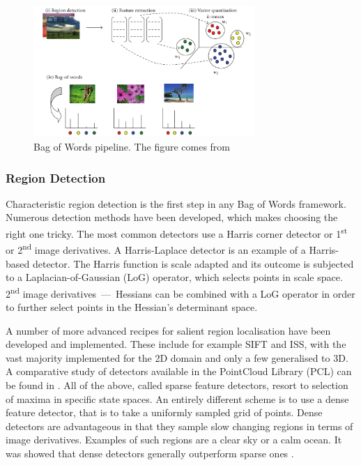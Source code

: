 \documentclass[12pt]{article}
\begin{document}
    \begin{figure}[!ht]
    \centering
    \includegraphics[width=0.75\textwidth]{../figs/tsai2012}
    \caption{Bag of Words pipeline. The figure comes from \cite{tsai2012bag}}
    \label{fig:bow_pipeline}
    \end{figure}
	
  \subsubsection{Region Detection}
    Characteristic region detection is the first step in any Bag of Words 
framework. Numerous detection methods have been developed, which makes choosing 
the right one tricky. The most common detectors use a Harris corner detector or 
1\textsuperscript{st} or 2\textsuperscript{nd} image derivatives. A 
Harris-Laplace detector is an example of a Harris-based detector. The Harris 
function is scale adapted and its outcome is subjected to a 
Laplacian-of-Gaussian (LoG) operator, which selects points in scale space. 
2\textsuperscript{nd} image derivatives~---~Hessians can be combined with a LoG 
operator in order to further select points in the Hessian's determinant space.

    A number of more advanced recipes for salient region localisation have been 
developed and implemented. These include for example SIFT
and ISS, with the vast majority 
implemented for the 2D domain and only a few generalised to 3D. A comparative 
study of detectors available in the PointCloud Library (PCL) can be found in 
\cite{pcl_keypoint_comparision, 3d_keypoint_eval}. All of the above, called 
sparse feature detectors, resort to selection of maxima in specific state 
spaces. An entirely different scheme is to use a dense feature detector, that 
is to take a uniformly sampled grid of points. Dense detectors are advantageous 
in that they sample slow changing regions in terms of image derivatives. 
Examples of such regions are a clear sky or a calm ocean. It was
showed that dense detectors generally outperform sparse ones 
\cite{tsai2012bag}.
    
\end{document}
